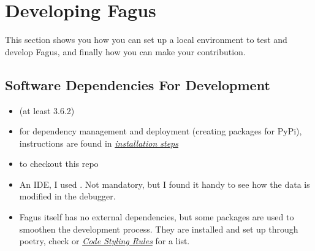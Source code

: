 \documentclass[a4paper,10pt,english]{sphinxmanual}
\begin{document}
\section{Developing Fagus}
\label{\detokenize{CONTRIBUTING:developing-fagus}}
\sphinxAtStartPar
This section shows you how you can set up a local environment to test and develop Fagus, and finally how you can make your contribution.


\subsection{Software Dependencies For Development}
\label{\detokenize{CONTRIBUTING:software-dependencies-for-development}}\begin{itemize}
\item {}
\sphinxAtStartPar
{} (at least 3.6.2)

\item {}
\sphinxAtStartPar
{} for dependency management and deployment (creating packages for PyPi), instructions are found in {\hyperref[\detokenize{CONTRIBUTING:setting-up-a-local-fagus-developing-environment}]{\emph{installation steps}}}

\item {}
\sphinxAtStartPar
{} to checkout this repo

\item {}
\sphinxAtStartPar
An IDE, I used . Not mandatory, but I found it handy to see how the data is modified in the debugger.

\item {}
\sphinxAtStartPar
Fagus itself has no external dependencies, but some packages are used to smoothen the development process. They are installed and set up through poetry, check  or {\hyperref[\detokenize{CONTRIBUTING:code-styling-guidelines}]{\emph{Code Styling Rules}}} for a list.

\end{itemize}
\end{document}
